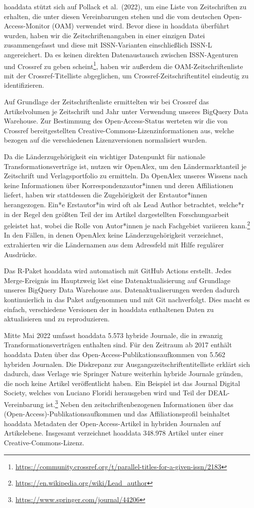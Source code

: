 \documentclass[a4paper,
fontsize=11pt,
oneside,
numbers=noperiodatend,
parskip=half-,
bibliography=totoc,
final
]{scrartcl}
\begin{document}
hoaddata stützt sich auf Pollack et al.~(2022), um eine Liste von
Zeitschriften zu erhalten, die unter diesen Vereinbarungen stehen und
die vom deutschen Open-Access-Monitor (OAM) verwendet wird. Bevor diese
in hoaddata überführt wurden, haben wir die Zeitschriftenangaben in
einer einzigen Datei zusammengefasst und diese mit ISSN-Varianten
einschließlich ISSN-L angereichert. Da es keinen direkten Datenaustausch
zwischen ISSN-Agenturen und Crossref zu geben scheint\footnote{\url{https://community.crossref.org/t/parallel-titles-for-a-given-issn/2183}},
haben wir außerdem die OAM-Zeitschriftenliste mit der
Crossref-Titelliste abgeglichen, um Crossref-Zeitschriftentitel
eindeutig zu identifizieren.

Auf Grundlage der Zeitschriftenliste ermittelten wir bei Crossref das
Artikelvolumen je Zeitschrift und Jahr unter Verwendung unseres BigQuery
Data Warehouse. Zur Bestimmung des Open-Access-Status werteten wir die
von Crossref bereitgestellten Creative-Commons-Lizenzinformationen aus,
welche bezogen auf die verschiedenen Lizenzversionen normalisiert
wurden.

Da die Länderzugehörigkeit ein wichtiger Datenpunkt für nationale
Transformationsverträge ist, nutzen wir OpenAlex, um den
Ländermarktanteil je Zeitschrift und Verlagsportfolio zu ermitteln. Da
OpenAlex unseres Wissens nach keine Informationen über
Korrespondenzautor*innen und deren Affiliationen liefert, haben wir
stattdessen die Zugehörigkeit der Erstautor*innen herangezogen. Ein*e
Erstautor*in wird oft als Lead Author betrachtet, welche*r in der Regel
den größten Teil der im Artikel dargestellten Forschungsarbeit geleistet
hat, wobei die Rolle von Autor*innen je nach Fachgebiet variieren
kann.\footnote{\url{https://en.wikipedia.org/wiki/Lead_author}} In den
Fällen, in denen OpenAlex keine Länderzugehörigkeit verzeichnet,
extrahierten wir die Ländernamen aus dem Adressfeld mit Hilfe regulärer
Ausdrücke.

Das R-Paket hoaddata wird automatisch mit GitHub Actions erstellt. Jedes
Merge-Ereignis im Hauptzweig löst eine Datenaktualisierung auf Grundlage
unseres BigQuery Data Warehouse aus. Datenaktualiserungen werden dadurch
kontinuierlich in das Paket aufgenommen und mit Git nachverfolgt. Dies
macht es einfach, verschiedene Versionen der in hoaddata enthaltenen
Daten zu aktualisieren und zu reproduzieren.

Mitte Mai 2022 umfasst hoaddata 5.573 hybride Journale, die in zwanzig
Transformationsverträgen enthalten sind. Für den Zeitraum ab 2017
enthält hoaddata Daten über das Open-Access-Publikationsaufkommen von
5.562 hybriden Journalen. Die Diskrepanz zur
Ausgangszeitschriftentitelliste erklärt sich dadurch, dass Verlage wie
Springer Nature weiterhin hybride Journale gründen, die noch keine
Artikel veröffentlicht haben. Ein Beispiel ist das Journal Digital
Society, welches von Luciano Floridi herausgeben wird und Teil der
DEAL-Vereinbarung ist.\footnote{\url{https://www.springer.com/journal/44206}}
Neben den zeitschriftenbezogenen Informationen über das
(Open-Access)-Publikationsaufkommen und das Affiliationsprofil
beinhaltet hoaddata Metadaten der Open-Access-Artikel in hybriden
Journalen auf Artikelebene. Insgesamt verzeichnet hoaddata 348.978
Artikel unter einer Creative-Commons-Lizenz.
\end{document}
